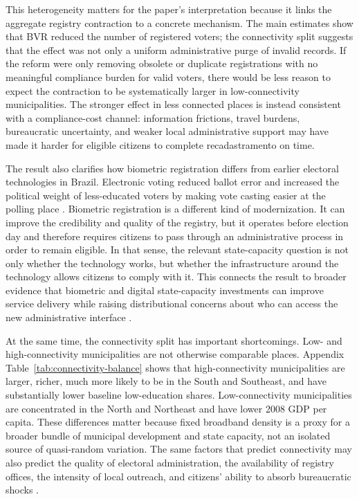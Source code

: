 This heterogeneity matters for the paper's interpretation because it links the aggregate registry contraction to a concrete mechanism. The main estimates show that BVR reduced the number of registered voters; the connectivity split suggests that the effect was not only a uniform administrative purge of invalid records. If the reform were only removing obsolete or duplicate registrations with no meaningful compliance burden for valid voters, there would be less reason to expect the contraction to be systematically larger in low-connectivity municipalities. The stronger effect in less connected places is instead consistent with a compliance-cost channel: information frictions, travel burdens, bureaucratic uncertainty, and weaker local administrative support may have made it harder for eligible citizens to complete recadastramento on time.

The result also clarifies how biometric registration differs from earlier electoral technologies in Brazil. Electronic voting reduced ballot error and increased the political weight of less-educated voters by making vote casting easier at the polling place \citep{Fujiwara2015VotingTechnoloPolitica}. Biometric registration is a different kind of modernization. It can improve the credibility and quality of the registry, but it operates before election day and therefore requires citizens to pass through an administrative process in order to remain eligible. In that sense, the relevant state-capacity question is not only whether the technology works, but whether the infrastructure around the technology allows citizens to comply with it. This connects the result to broader evidence that biometric and digital state-capacity investments can improve service delivery while raising distributional concerns about who can access the new administrative interface \citep{Muralidharan2016BuildingStateCapacity, Bossuroy2024BiometriMonitoriService}.

At the same time, the connectivity split has important shortcomings. Low- and high-connectivity municipalities are not otherwise comparable places. Appendix Table~\ref{tab:connectivity-balance} shows that high-connectivity municipalities are larger, richer, much more likely to be in the South and Southeast, and have substantially lower baseline low-education shares. Low-connectivity municipalities are concentrated in the North and Northeast and have lower 2008 GDP per capita. These differences matter because fixed broadband density is a proxy for a broader bundle of municipal development and state capacity, not an isolated source of quasi-random variation. The same factors that predict connectivity may also predict the quality of electoral administration, the availability of registry offices, the intensity of local outreach, and citizens' ability to absorb bureaucratic shocks \citep{besleyPersson2011, AcemogluRobinson2019}.

